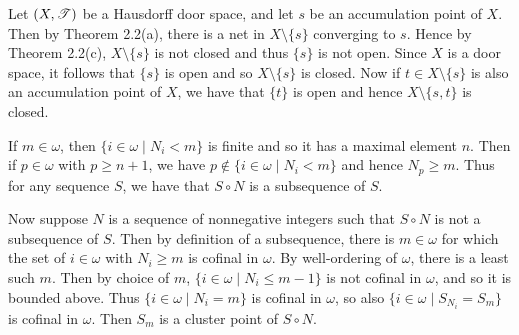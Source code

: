 \begin{prob}

\end{prob}

\begin{prob}

\end{prob}

\begin{prob}
Let $(X, \mathscr{T})$ be a Hausdorff door space, and let $s$ be an accumulation point of $X$. Then by Theorem 2.2(a), there is a net in $X\setminus\{s\}$ converging to $s$. Hence by Theorem 2.2(c), $X\setminus\{s\}$ is not closed and thus $\{s\}$ is not open. Since $X$ is a door space, it follows that $\{s\}$ is open and so $X\setminus\{s\}$ is closed. Now if $t \in X\setminus\{s\}$ is also an accumulation point of $X$, we have that $\{t\}$ is open and hence $X\setminus\{s, t\}$ is closed.
\end{prob}

\begin{prob}
If $m \in \omega$, then $\{i \in \omega\mid N_i < m\}$ is finite and so it has a maximal element $n$. Then if $p \in \omega$ with $p \geq n + 1$, we have $p \not \in \{i \in \omega\mid N_i < m\}$ and hence $N_p \geq m$. Thus for any sequence $S$, we have that $S\circ N$ is a subsequence of $S$.

Now suppose $N$ is a sequence of nonnegative integers such that $S\circ N$ is not a subsequence of $S$. Then by definition of a subsequence, there is $m \in \omega$ for which the set of $i \in \omega$ with $N_i \geq m$ is cofinal in $\omega$. By well-ordering of $\omega$, there is a least such $m$. Then by choice of $m$, $\{i \in \omega\mid N_i \leq m-1\}$ is not cofinal in $\omega$, and so it is bounded above. Thus $\{i \in \omega\mid N_i = m\}$ is cofinal in $\omega$, so also $\{i \in \omega\mid S_{N_i} = S_m\}$ is cofinal in $\omega$. Then $S_m$ is a cluster point of $S\circ N$.
\end{prob}

